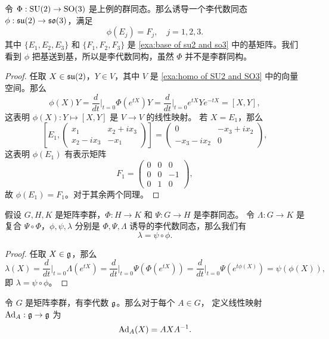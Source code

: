 \begin{example}
  令 $\Phi:\operatorname{SU}(2)\to\operatorname{SO}(3)$ 是上例的群同态。那么诱导一个李代数同态
  $\phi:\mathfrak{su}(2)\to\mathfrak{so}(3)$，满足
  \[
    \phi(E_j)=F_j,\quad j=1,2,3.
  \]
  其中 $\{E_1,E_2,E_3\}$ 和 $\{F_1,F_2,F_3\}$ 是 \autoref{exa:base of su2 and so3}
  中的基矩阵。我们看到 $\phi$ 把基送到基，所以是李代数同构，虽然 $\Phi$
  并不是李群同构。
\end{example}
\begin{proof}
  任取 $X\in\mathfrak{su}(2)$，$Y\in V$，其中 $V$ 是 \autoref{exa:homo of SU2 and SO3}
  中的向量空间。那么
  \[
    \phi(X)Y=\frac{d}{dt}\bigg|_{t=0}\Phi(e^{tX})Y
    =\frac{d}{dt}\bigg|_{t=0} e^{tX}Ye^{-tX}=[X,Y],
  \]
  这表明 $\phi(X):Y\mapsto [X,Y]$ 是 $V\to V$ 的线性映射。
  若 $X=E_1$，那么
  \[
    \left[E_1,
    \begin{pmatrix}
      x_1 & x_2+ix_3\\
      x_2-ix_3 & -x_1 
    \end{pmatrix}
    \right]=\begin{pmatrix}
      0 & -x_3+ix_2\\
      -x_3-ix_2 & 0
    \end{pmatrix},
  \]
  这表明 $\phi(E_1)$ 有表示矩阵
  \[
    F_1=\begin{pmatrix}
      0 & 0 & 0 \\
      0 & 0 & -1 \\
      0 & 1 & 0
    \end{pmatrix},
  \] 
  故 $\phi(E_1)=F_1$。对于其余两个同理。
\end{proof}

\begin{proposition}
  假设 $G,H,K$ 是矩阵李群，$\Phi:H\to K$ 和 $\Psi:G\to H$ 是李群同态。
  令 $\Lambda:G\to K$ 是复合 $\Psi\circ\Phi$，$\phi,\psi,\lambda$
  分别是 $\Phi,\Psi,\Lambda$ 诱导的李代数同态，那么我们有
  \[
    \lambda=\psi\circ \phi.
  \]
\end{proposition}
\begin{proof}
  任取 $X\in\mathfrak{g}$，那么
  \[
    \lambda(X)=\frac{d}{dt}\bigg|_{t=0}\Lambda(e^{tX})
    =\frac{d}{dt}\bigg|_{t=0}\Psi(\Phi(e^{tX}))
    =\frac{d}{dt}\bigg|_{t=0}\Psi(e^{t\phi(X)})
    =\psi(\phi(X)),
  \]
  即 $\lambda=\psi\circ\phi$。
\end{proof}

\begin{definition}
  令 $G$ 是矩阵李群，有李代数 $\mathfrak{g}$。那么对于每个 $A\in G$，
  定义线性映射 $\operatorname{Ad}_A:\mathfrak{g}\to\mathfrak{g}$ 为
  \[
    \operatorname{Ad}_A(X)=AXA^{-1}.
  \]
\end{definition}

